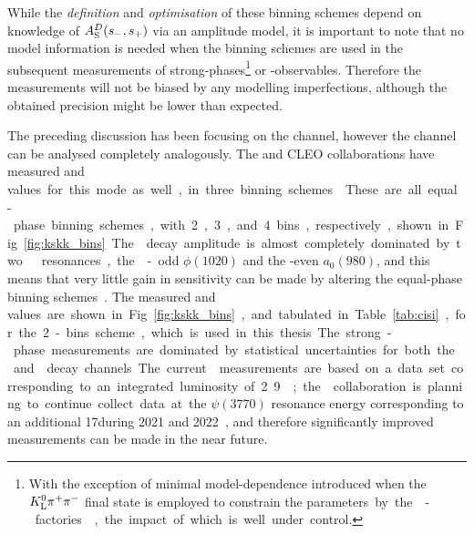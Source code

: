 

While the \emph{definition} and \emph{optimisation} of these binning schemes depend on knowledge of $A_{\rm S}^{D}(s_-, s_+)$ via an amplitude model, it is important to note that no model information is needed when the binning schemes are used in the subsequent measurements of strong-phases\footnote{With the exception of minimal model-dependence introduced when the ${{K}^0_{\mathrm{L}}}{{\pi}^+}{{\pi}^-}$ final state is employed to constrain the \si parameters by the \D-factories~\cite{CLEOCISI,BESCISI,BESCISIKSKK}, the impact of which is well under control.} or \CP-observables. Therefore the measurements will not be biased by any modelling imperfections, although the obtained precision might be lower than expected. 





The preceding discussion has been focusing on the \DtoKspipi channel, however the \DtoKsKK channel can be analysed completely analogously. The \besiii and CLEO collaborations have measured \ci and \si values for this mode as well, in three binning schemes~\cite{CLEOCISI,BESCISIKSKK}. These are all equal-phase binning schemes, with 2, 3, and 4 bins, respectively, shown in Fig.~\ref{fig:kskk_bins}. The \DtoKsKK decay amplitude is almost completely dominated by two \Kp\Km resonances, the \CP-odd $\phi(1020)$ and the \CP-even  $a_0(980)$, and this means that very little gain in sensitivity can be made by altering the equal-phase binning schemes~\cite{CLEOCISI}. The measured \ci and \si values are shown in Fig.~\ref{fig:kskk_bins}, and tabulated in Table~\ref{tab:cisi}, for the 2-bins scheme, which is used in this thesis. 

The strong-phase measurements are dominated by statistical uncertainties for both the \DtoKspp and \DtoKskk decay channels. The current \besiii measurements are based on a data set corresponding to an integrated luminosity of 2.9\invfb; the \besiii collaboration is planning to continue collect data at the $\psi(3770)$ resonance energy corresponding to an additional 17\invfb during 2021 and 2022~\cite{dsds}, and therefore significantly improved measurements can be made in the near future.

